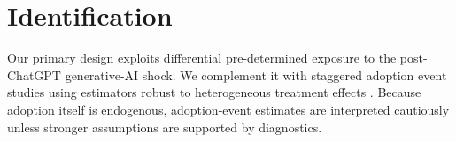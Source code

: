 \section{Identification}
Our primary design exploits differential pre-determined exposure to the post-ChatGPT generative-AI shock. We complement it with staggered adoption event studies using estimators robust to heterogeneous treatment effects \citep{callaway2021,sunabraham2021}. Because adoption itself is endogenous, adoption-event estimates are interpreted cautiously unless stronger assumptions are supported by diagnostics.
